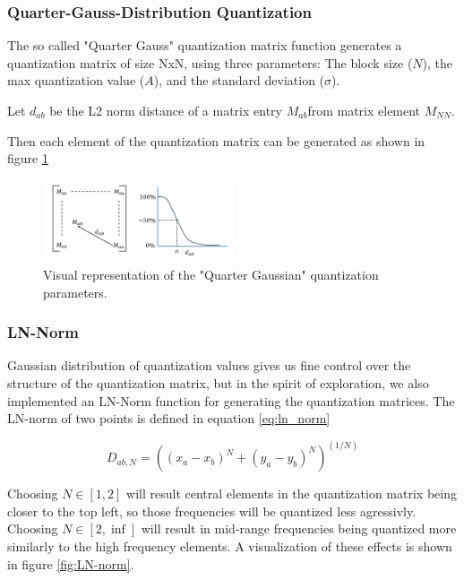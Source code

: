 \subsubsection{Quarter-Gauss-Distribution Quantization}

The so called "Quarter Gauss" quantization matrix function generates a quantization matrix of size NxN, using three parameters: The block size ($N$), the max quantization value ($A$), and the standard deviation ($\sigma$).

Let $d_{ab}$ be the L2 norm distance of a matrix entry $M_{ab}$from matrix element $M_{NN}$.

Then each element of the quantization matrix can be generated as shown in figure \ref{fig:gaussian_quant}

\begin{figure}
	\includegraphics[width=0.5\textwidth]{assets/Quarter Gauss Quantization.png}
	\caption{Visual representation of the "Quarter Gaussian" quantization parameters.}
	\label{fig:gaussian_quant}
\end{figure}

\subsubsection{LN-Norm}

Gaussian distribution of quantization values gives us fine control over the structure of the quantization matrix, but in the spirit of exploration, we also implemented an LN-Norm function for generating the quantization matrices.
The LN-norm of two points is defined in equation \ref{eq:ln_norm}

\begin{equation}
D_{ab, N} = ((x_a - x_b)^N + (y_a - y_b)^N)^{(1/N)}
\label{eq:ln_norm}
\end{equation}

Choosing $N\in[1,2]$ will result central elements in the quantization matrix being closer to the top left, so those frequencies will be quantized less agressivly. Choosing $N\in[2,\inf]$ will result in mid-range frequencies being quantized more similarly to the high frequency elements. 
A visualization of these effects is shown in figure \ref{fig:LN-norm}.


